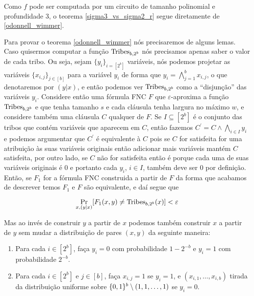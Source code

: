Como $f$ pode ser computada por um circuito de tamanho polinomial e profundidade 3, o teorema \ref{sigma3_vs_sigma2_r} segue diretamente de \ref{odonnell_wimmer}.

Para provar o teorema \ref{odonnell_wimmer} nós precisaremos de alguns lemas. Caso quisermos computar a função $\text{Tribes}_{b, 2^{b}}$ nós precisamos apenas saber o valor de cada tribo. Ou seja, sejam $\{y_{i}\}_{i = [2^{b}]}$ variáveis, nós podemos projetar as variáveis $\{x_{i, j}\}_{j \in [b]}$ para a variável $y_{i}$ de forma que $y_{i} = \bigwedge_{j = 1}^{b} x_{i, j}$, o que denotaremos por $(y \lvert x)$, e então podemos ver $\text{Tribes}_{b, 2^{b}}$ como a ``disjunção'' das variáveis $y_{i}$. Considere então uma fórmula FNC $F$ que $\varepsilon$-aproxima a função $\text{Tribes}_{b, 2^{b}}$ e que tenha tamanho $s$ e cada cláusula tenha largura no máximo $w$, e considere também uma cláusula $C$ qualquer de $F$. Se $I \subseteq [2^{b}]$ é o conjunto das tribos que contém variáveis que aparecem em $C$, então fazemos $C^{\prime} = C \land \bigwedge_{i \in I} y_{i}$ e podemos argumentar que $C^{\prime}$ é equivalente à $C$ pois se $C$ for satisfeita for uma atribuição às suas variáveis originais então adicionar mais variáveis mantém $C$ satisfeita, por outro lado, se $C$ não for satisfeita então é porque cada uma de suas variáveis originais é 0 e portanto cada $y_{i}$, $i \in I$, também deve ser 0 por definição. Então, se $F_{1}$ for a fórmula FNC construida a partir de $F$ da forma que acabamos de descrever temos $F_{1}$ e $F$ são equivalente, e daí segue que

\begin{equation*}
	\Pr_{x, (y \lvert x)}[F_{1}(x, y) \neq \text{Tribes}_{b, 2^{b}}(x)] < \varepsilon
\end{equation*}

Mas ao invés de construir $y$ a partir de $x$ podemos também construir $x$ a partir de $y$ sem mudar a distribuição de pares $(x, y)$ da seguinte maneira:

\begin{enumerate}

	\item Para cada $i \in [2^{b}]$, faça $y_{i} = 0$ com probabilidade $1 - 2^{-b}$ e $y_{i} = 1$ com probabilidade $2^{-b}$.
	
	\item Para cada $i \in [2^{b}]$ e $j \in [b]$, faça $x_{i, j} = 1$ se $y_{i} = 1$, e $(x_{i, 1}, \dots, x_{i, b})$ tirada da distribuição uniforme sobre $\{0, 1\}^{b} \setminus (1, 1, \dots, 1)$ se $y_{i} = 0$. 

\end{enumerate}

